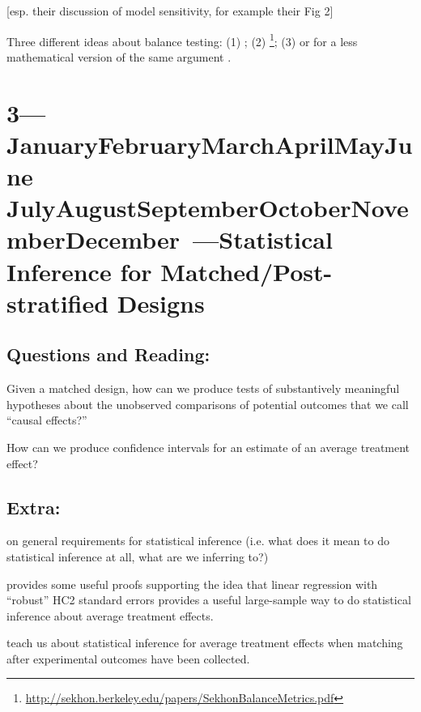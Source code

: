 \documentclass[10pt]{article}
\def\themonth{\ifcase\month\or
  January\or February\or March\or April\or May\or June\or
  July\or August\or September\or October\or November\or December\fi}
\begin{document}
\cite{ho2007man} [esp. their discussion of model sensitivity, for
example their Fig 2]

Three different ideas about balance testing: (1) \cite{imai2008mae}; (2)
\cite{sekhon2007alternative}\footnote{
  \url{http://sekhon.berkeley.edu/papers/SekhonBalanceMetrics.pdf}}; (3)
\cite{hansen2008cbs} \cite{hansen:statmed:2008} or for a less mathematical
version of the same argument \cite[\S 3]{bowers2011mem}.



\AdvanceDate[1]
\section{3---\themonth~\the\day---Statistical Inference for Matched/Post-stratified Designs}


\subsection{Questions and Reading:}

Given a matched design, how can we produce tests of substantively meaningful
hypotheses about the unobserved comparisons of potential outcomes that we call
``causal effects?''

\citealp[Chap 2]{rosenbaum2010design}

How can we produce  confidence intervals for an estimate of an average
treatment effect?

\citealp[Chap 6.1 and Appendix 6.1]{dunning2012natural}

\citealp[Chap 17]{imbens2009causal}

\subsection{Extra:}

\citealp[Chap 4]{berk04} on general requirements for statistical
inference (i.e. what does it mean to do statistical inference at all, what are
we inferring to?)


\cite{linlr:2011} provides some useful proofs supporting the idea
that linear regression with ``robust'' HC2 standard errors provides a
useful large-sample way to do statistical inference about average
treatment effects.

\cite{miratrix2012adjusting} teach us about statistical inference for average
treatment effects when matching after experimental outcomes have been
collected.
\end{document}
